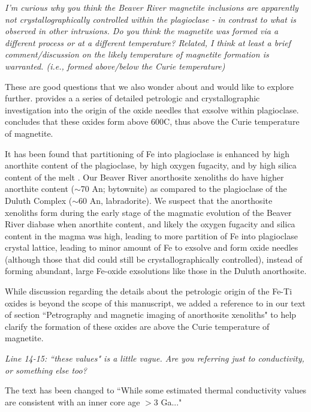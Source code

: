 \documentclass[11pt, letterpaper]{article}
\begin{document}
\begin{flushleft}
\textit{I'm curious why you think the Beaver River magnetite inclusions are apparently not crystallographically controlled within the plagioclase - in contrast to what is observed in other intrusions. Do you think the magnetite was formed via a different process or at a different temperature? Related, I think at least a brief comment/discussion on the likely temperature of magnetite formation is warranted. (i.e., formed above/below the Curie temperature)}

These are good questions that we also wonder about and would like to explore further. \cite{Ageeva2016a, Ageeva2017a, Ageeva2020a, Bian2021, Ageeva2022a} provides a a series of detailed petrologic and crystallographic investigation into the origin of the oxide needles that exsolve within plagioclase. \cite{Bian2021a} concludes that these oxides form above 600\textdegree C, thus above the Curie temperature of magnetite.

It has been found that partitioning of Fe into plagioclase is enhanced by high anorthite content of the plagioclase, by high oxygen fugacity, and by high silica content of the melt \cite{Phinney1992a, Longhi1976a}. Our Beaver River anorthosite xenoliths do have higher anorthite content ($\sim$70 An; bytownite) as compared to the plagioclase of the Duluth Complex ($\sim$60 An, labradorite). We suspect that the anorthosite xenoliths form during the early stage of the magmatic evolution of the Beaver River diabase when anorthite content, and likely the oxygen fugacity and silica content in the magma was high, leading to more partition of Fe into plagioclase crystal lattice, leading to minor amount of Fe to exsolve and form oxide needles (although those that did could still be crystallographically controlled), instead of forming abundant, large Fe-oxide exsolutions like those in the Duluth anorthosite. 

While discussion regarding the details about the petrologic origin of the Fe-Ti oxides is beyond the scope of this manuscript, we added a reference to \cite{Bian2021a} in our text of section ``Petrography and magnetic imaging of anorthosite xenoliths" to help clarify the formation of these oxides are above the Curie temperature of magnetite.


\textit{Line 14-15: ``these values" is a little vague. Are you referring just to conductivity, or something else too?}

The text has been changed to ``While some estimated thermal conductivity values are consistent with an inner core age $>$3 Ga..."


\end{flushleft}
\end{document}
